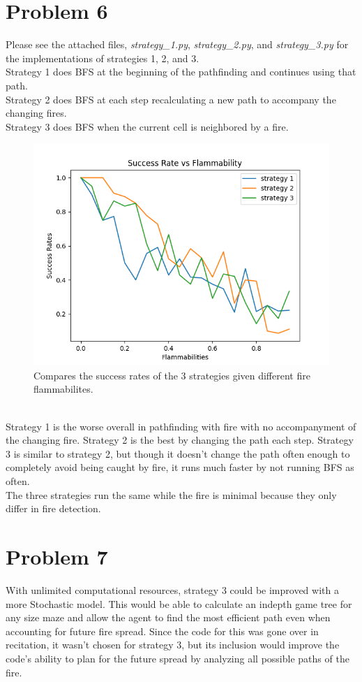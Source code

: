 \documentclass[12pt]{report}
\begin{document}
\section{Problem 6}
Please see the attached files, \emph{strategy\_1.py}, \emph{strategy\_2.py}, and \emph{strategy\_3.py} for the implementations of strategies 1, 2, and 3.\\
Strategy 1 does BFS at the beginning of the pathfinding and continues using that path.\\
Strategy 2 does BFS at each step recalculating a new path to accompany the changing fires.\\
Strategy 3 does BFS when the current cell is neighbored by a fire.
\begin{figure}[h]
\includegraphics[width=\textwidth]{Success Rate vs Flammability.png}
\caption{Compares the success rates of the 3 strategies given different fire flammabilites.}
\label{Success Rate vs Flammability}
\end{figure}\\
Strategy 1 is the worse overall in pathfinding with fire with no accompanyment of the changing fire. Strategy 2 is the best by changing the path each step. Strategy 3 is similar to strategy 2, but though it doesn't change the path often enough to completely avoid being caught by fire, it runs much faster by not running BFS as often.\\
The three strategies run the same while the fire is minimal because they only differ in fire detection.

\section{Problem 7}
With unlimited computational resources, strategy 3 could be improved with a more Stochastic model. This would be able to calculate an indepth game tree for any size maze and allow the agent to find the most efficient path even when accounting for future fire spread. Since the code for this was gone over in recitation, it wasn't chosen for strategy 3, but its inclusion would improve the code's ability to plan for the future spread by analyzing all possible paths of the fire.
\end{document}

